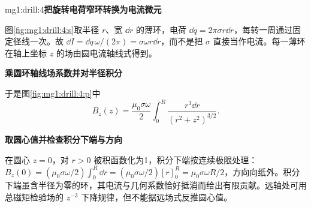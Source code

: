 \begin{drillsolution}{mg1:drill:4}\textbf{把旋转电荷窄环转换为电流微元}\par\nobreak
图\ref{fig:mg1:drill:4:s}取半径 $r$、宽 $\dd r$ 的薄环，电荷 $\dd q=2\pi\sigma r\dd r$，每转一周通过固定径线一次。故 $\dd I=\dd q\,\omega/(2\pi)=\sigma\omega r\dd r$，而不是把 $\sigma$ 直接当作电流。每一薄环在轴上坐标 $z$ 的场由圆电流轴线式得到。



\par\medskip{}\noindent\textbf{乘圆环轴线场系数并对半径积分}\par\nobreak
于是图\ref{fig:mg1:drill:4:p}中
\[
B_z(z)=\frac{\mu_0\sigma\omega}{2}\int_0^R
\frac{r^3\dd r}{(r^2+z^2)^{3/2}}.
\]


\par\medskip{}\noindent\textbf{取圆心值并检查积分下端与方向}\par\nobreak
在圆心 $z=0$，对 $r>0$ 被积函数化为1，积分下端按连续极限处理：
$B_z(0)=(\mu_0\sigma\omega/2)\int_0^R\dd r
=(\mu_0\sigma\omega/2)[r]_0^R=\mu_0\sigma\omega R/2$，方向向纸外。积分下端虽含半径为零的环，其电流与几何系数恰好抵消而给出有限贡献。远轴处可用总磁矩检验场的 $z^{-3}$ 下降规律，但不能据远场式反推圆心值。\end{drillsolution}

